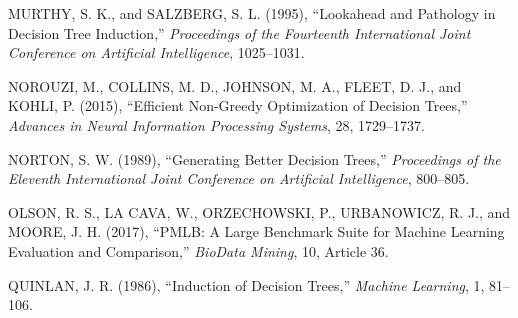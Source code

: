\documentclass[12pt]{article}
\begin{document}
\begin{thebibliography}{}
MURTHY, S. K., and SALZBERG, S. L. (1995),
``Lookahead and Pathology in Decision Tree Induction,''
\emph{Proceedings of the Fourteenth International Joint Conference on Artificial Intelligence}, 1025--1031.

NOROUZI, M., COLLINS, M. D., JOHNSON, M. A., FLEET, D. J., and KOHLI, P. (2015),
``Efficient Non-Greedy Optimization of Decision Trees,''
\emph{Advances in Neural Information Processing Systems}, 28, 1729--1737.

NORTON, S. W. (1989),
``Generating Better Decision Trees,''
\emph{Proceedings of the Eleventh International Joint Conference on Artificial Intelligence}, 800--805.

OLSON, R. S., LA CAVA, W., ORZECHOWSKI, P., URBANOWICZ, R. J., and MOORE, J. H. (2017),
``PMLB: A Large Benchmark Suite for Machine Learning Evaluation and Comparison,''
\emph{BioData Mining}, 10, Article 36.

QUINLAN, J. R. (1986),
``Induction of Decision Trees,''
\emph{Machine Learning}, 1, 81--106.

\end{thebibliography}
\end{document}
